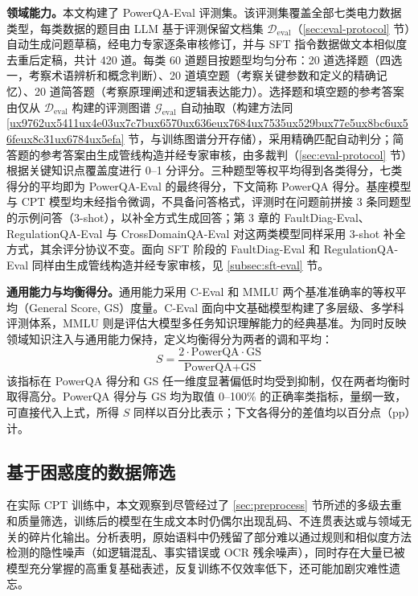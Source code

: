 \documentclass[fontset=fandol,type=master,campus=shenzhen,etitleauto=true]{hithesisbook}
\begin{document}
\textbf{领域能力。}本文构建了 PowerQA-Eval 评测集。该评测集覆盖全部七类电力数据类型，每类数据的题目由 LLM 基于评测保留文档集 $\mathcal{D}_{\text{eval}}$（\ref{sec:eval-protocol} 节）自动生成问题草稿，经电力专家逐条审核修订，并与 SFT 指令数据做文本相似度去重后定稿，共计 420 道。每类 60 道题目按题型均匀分布：20 道选择题（四选一，考察术语辨析和概念判断）、20 道填空题（考察关键参数和定义的精确记忆）、20 道简答题（考察原理阐述和逻辑表达能力）。选择题和填空题的参考答案由仅从 $\mathcal{D}_{\text{eval}}$ 构建的评测图谱 $\mathcal{G}_{\text{eval}}$ 自动抽取（构建方法同 \ref{ux9762ux5411ux4e03ux7c7bux6570ux636eux7684ux7535ux529bux77e5ux8bc6ux56feux8c31ux6784ux5efa} 节，与训练图谱分开存储），采用精确匹配自动判分；简答题的参考答案由生成管线构造并经专家审核，由多裁判（\ref{sec:eval-protocol} 节）根据关键知识点覆盖度进行 0--1 分评分。三种题型等权平均得到各类得分，七类得分的平均即为 PowerQA-Eval 的最终得分，下文简称 PowerQA 得分。基座模型与 CPT 模型均未经指令微调，不具备问答格式，评测时在问题前拼接 3 条同题型的示例问答（3-shot），以补全方式生成回答；第 3 章的 FaultDiag-Eval、RegulationQA-Eval 与 CrossDomainQA-Eval 对这两类模型同样采用 3-shot 补全方式，其余评分协议不变。面向 SFT 阶段的 FaultDiag-Eval 和 RegulationQA-Eval 同样由生成管线构造并经专家审核，见 \ref{subsec:sft-eval} 节。

\textbf{通用能力与均衡得分。}通用能力采用 C-Eval 和 MMLU 两个基准准确率的等权平均（General Score, GS）度量。C-Eval 面向中文基础模型构建了多层级、多学科评测体系\cite{ref66}，MMLU 则是评估大模型多任务知识理解能力的经典基准\cite{ref67}。为同时反映领域知识注入与通用能力保持，定义均衡得分为两者的调和平均：
\begin{equation}
S = \frac{2 \cdot \text{PowerQA} \cdot \text{GS}}{\text{PowerQA} + \text{GS}}
\end{equation}
该指标在 PowerQA 得分和 GS 任一维度显著偏低时均受到抑制，仅在两者均衡时取得高分。PowerQA 得分与 GS 均为取值 0--100\% 的正确率类指标，量纲一致，可直接代入上式，所得 $S$ 同样以百分比表示；下文各得分的差值均以百分点（pp）计。

\subsection{基于困惑度的数据筛选}\label{ux57faux4e8eux56f0ux60d1ux5ea6ux7684ux6570ux636eux7b5bux9009}

在实际 CPT 训练中，本文观察到尽管经过了 \ref{sec:preprocess} 节所述的多级去重和质量筛选，训练后的模型在生成文本时仍偶尔出现乱码、不连贯表达或与领域无关的碎片化输出。分析表明，原始语料中仍残留了部分难以通过规则和相似度方法检测的隐性噪声（如逻辑混乱、事实错误或 OCR 残余噪声），同时存在大量已被模型充分掌握的高重复基础表述，反复训练不仅效率低下，还可能加剧灾难性遗忘。
\end{document}
